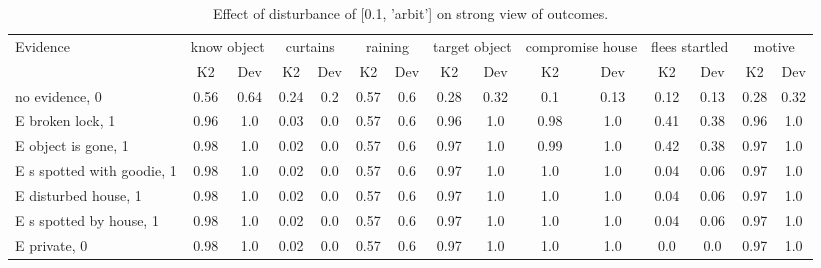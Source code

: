 \begin{table}\begin{tabular}{l|cc|cc|cc|cc|cc|cc|cc}\toprule\multirow{2}{*}{Evidence} & \multicolumn{2}{c}{know object}& \multicolumn{2}{c}{curtains}& \multicolumn{2}{c}{raining}& \multicolumn{2}{c}{target object}& \multicolumn{2}{c}{compromise house}& \multicolumn{2}{c}{flees startled}& \multicolumn{2}{c}{motive}\\& {K2} & {Dev}& {K2} & {Dev}& {K2} & {Dev}& {K2} & {Dev}& {K2} & {Dev}& {K2} & {Dev}& {K2} & {Dev}\\\midrule
no evidence, 0 & \cellcolor{Bittersweet}0.56&\cellcolor{Bittersweet}0.64&0.24&0.2&0.57&0.6&0.28&0.32&0.1&0.13&0.12&0.13&0.28&0.32\\E broken lock, 1 & 0.96&1.0&0.03&0.0&0.57&0.6&0.96&1.0&0.98&1.0&0.41&0.38&0.96&1.0\\E object is gone, 1 & 0.98&1.0&0.02&0.0&0.57&0.6&0.97&1.0&0.99&1.0&0.42&0.38&0.97&1.0\\E s spotted with goodie, 1 & 0.98&1.0&0.02&0.0&0.57&0.6&0.97&1.0&1.0&1.0&0.04&0.06&0.97&1.0\\E disturbed house, 1 & 0.98&1.0&0.02&0.0&0.57&0.6&0.97&1.0&1.0&1.0&0.04&0.06&0.97&1.0\\E s spotted by house, 1 & 0.98&1.0&0.02&0.0&0.57&0.6&0.97&1.0&1.0&1.0&0.04&0.06&0.97&1.0\\E private, 0 & 0.98&1.0&0.02&0.0&0.57&0.6&0.97&1.0&1.0&1.0&0.0&0.0&0.97&1.0\\\bottomrule\end{tabular}\caption{Effect of disturbance of [0.1, 'arbit'] on strong view of outcomes.}\end{table}